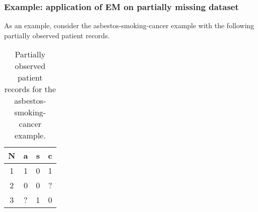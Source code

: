 \documentclass{article}
\begin{document}
\subsubsection{Example: application of EM on partially missing dataset}

\noindent As an example, consider the asbestos-smoking-cancer example with the following partially observed patient records. 

\begin{table}[H]
    \centering
    \caption{Partially observed patient records for the asbestos-smoking-cancer example. }\label{tab:records3}
    \vspace{5mm}
    \begin{tabular}{c|ccc}
    \hline
        \textbf{N} & \textbf{a} & \textbf{s} & \textbf{c} \\ \hline 
        1 & 1 & 0 & 1 \\
        2 & 0 & 0 & ? \\
        3 & ? & 1 & 0 \\
        \hline
    \end{tabular}
\end{table}
\end{document}
